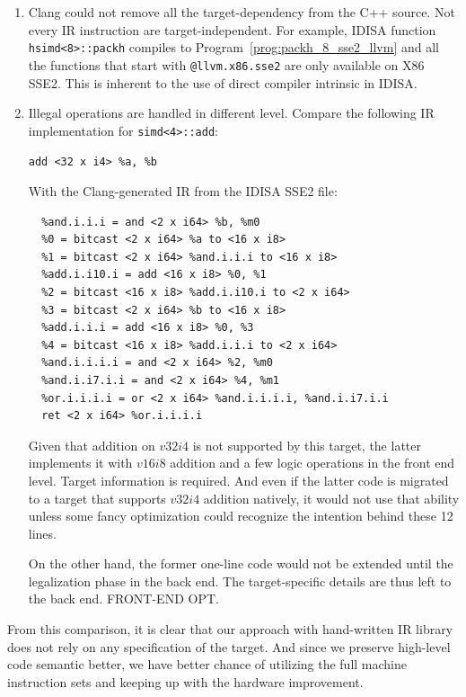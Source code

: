 \begin{enumerate}
    \item Clang could not remove all the target-dependency from the C++ source. Not every IR instruction are target-independent. For example, IDISA function {\tt hsimd<8>::packh} compiles to Program~\ref{prog:packh_8_sse2_llvm} and all the functions that start with {\tt @llvm.x86.sse2} are only available on X86 SSE2. This is inherent to the use of direct compiler intrinsic in IDISA.
    \item Illegal operations are handled in different level. Compare the following IR implementation for {\tt simd<4>::add}:
      \begin{center}
        \verb|add <32 x i4> %a, %b|
      \end{center}
    With the Clang-generated IR from the IDISA SSE2 file:
      \begin{center}
        \begin{verbatim}
  %and.i.i.i = and <2 x i64> %b, %m0
  %0 = bitcast <2 x i64> %a to <16 x i8>
  %1 = bitcast <2 x i64> %and.i.i.i to <16 x i8>
  %add.i.i10.i = add <16 x i8> %0, %1
  %2 = bitcast <16 x i8> %add.i.i10.i to <2 x i64>
  %3 = bitcast <2 x i64> %b to <16 x i8>
  %add.i.i.i = add <16 x i8> %0, %3
  %4 = bitcast <16 x i8> %add.i.i.i to <2 x i64>
  %and.i.i.i.i = and <2 x i64> %2, %m0
  %and.i.i7.i.i = and <2 x i64> %4, %m1
  %or.i.i.i.i = or <2 x i64> %and.i.i.i.i, %and.i.i7.i.i
  ret <2 x i64> %or.i.i.i.i
        \end{verbatim}
      \end{center}

    Given that addition on $v32i4$ is not supported by this target, the latter implements it with $v16i8$ addition and a few logic operations in the front end level. Target information is required. And even if the latter code is migrated to a target that supports $v32i4$ addition natively, it would not use that ability unless some fancy optimization could recognize the intention behind these 12 lines.

    On the other hand, the former one-line code would not be extended until the legalization phase in the back end. The target-specific details are thus left to the back end. FRONT-END OPT.
\end{enumerate}

From this comparison, it is clear that our approach with hand-written IR library does not rely on any specification of the target. And since we preserve high-level code semantic better, we have better chance of utilizing the full machine instruction sets and keeping up with the hardware improvement.

